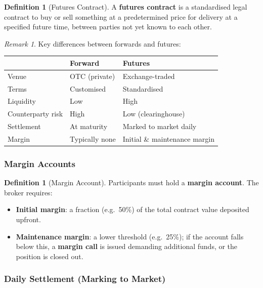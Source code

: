 \documentclass[12pt, a4paper]{article}
\theoremstyle{plain}
\theoremstyle{definition}
\newtheorem{definition}[theorem]{Definition}
\theoremstyle{remark}
\newtheorem{remark}[theorem]{Remark}
\begin{document}
\begin{definition}[Futures Contract]
  A \textbf{futures contract} is a standardised legal contract to buy or sell something at a predetermined price for delivery at a specified future time, between parties not yet known to each other.
\end{definition}

\begin{remark}
  Key differences between forwards and futures:
  \begin{center}
  \begin{tabular}{lll}
    \hline
    & \textbf{Forward} & \textbf{Futures} \\
    \hline
    Venue & OTC (private) & Exchange-traded \\
    Terms & Customised & Standardised \\
    Liquidity & Low & High \\
    Counterparty risk & High & Low (clearinghouse) \\
    Settlement & At maturity & Marked to market daily \\
    Margin & Typically none & Initial \& maintenance margin \\
    \hline
  \end{tabular}
  \end{center}
\end{remark}

\subsubsection{Margin Accounts}

\begin{definition}[Margin Account]
  Participants must hold a \textbf{margin account}. The broker requires:
  \begin{itemize}
    \item \textbf{Initial margin}: a fraction (e.g.\ 50\%) of the total contract value deposited upfront.
    \item \textbf{Maintenance margin}: a lower threshold (e.g.\ 25\%); if the account falls below this, a \textbf{margin call} is issued demanding additional funds, or the position is closed out.
  \end{itemize}
\end{definition}

\subsubsection{Daily Settlement (Marking to Market)}
\end{document}
